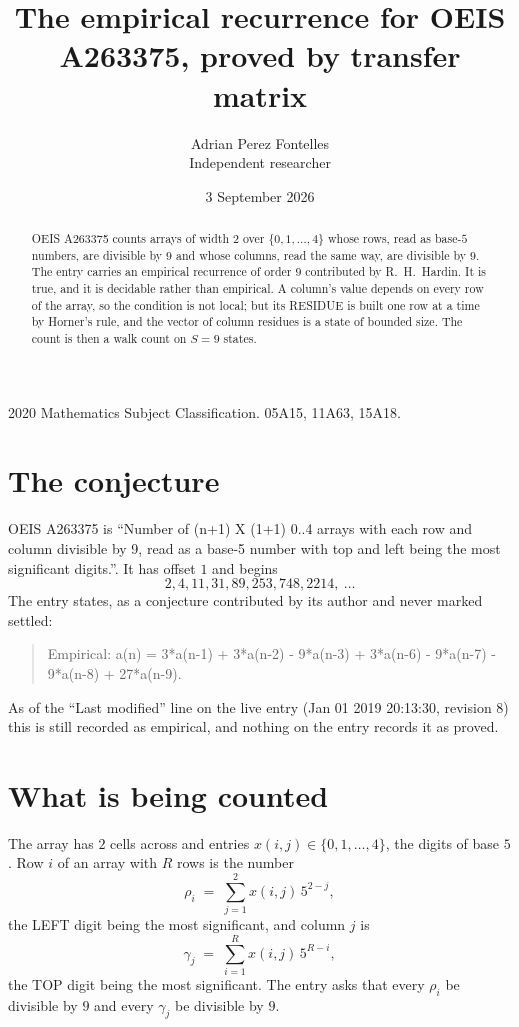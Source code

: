 \documentclass[11pt,a4paper]{article}
\title{The empirical recurrence for OEIS A263375, proved by transfer matrix}
\author{Adrian Perez Fontelles\\ \small Independent researcher}
\date{3 September 2026}
\theoremstyle{plain}
\theoremstyle{definition}
\begin{document}
\maketitle

\begin{abstract}
OEIS A263375 counts arrays of width $2$ over $\{0,1,\dots,4\}$ whose rows, read as base-$5$
numbers, are divisible by $9$ and whose columns, read the same way, are divisible by
$9$. The entry carries an empirical recurrence of order $9$ contributed by
R.~H.~Hardin. It is true, and it is decidable rather than empirical. A column's value depends on
every row of the array, so the condition is not local; but its RESIDUE is built one row at a
time by Horner's rule, and the vector of column residues is a state of bounded size. The count
is then a walk count on $S=9$ states.
\end{abstract}

\noindent\small 2020 Mathematics Subject Classification. 05A15, 11A63, 15A18.\normalsize

\section{The conjecture}

OEIS A263375 is ``Number of (n+1) X (1+1) 0..4 arrays with each row and column divisible by 9, read as a base-5 number with top and left being the most significant digits.''. It has offset $1$ and begins
\[
2, 4, 11, 31, 89, 253, 748, 2214,\ \dots
\]
The entry states, as a conjecture contributed by its author and never marked settled:
\begin{quote}
Empirical: a(n) = 3*a(n-1) + 3*a(n-2) - 9*a(n-3) + 3*a(n-6) - 9*a(n-7) - 9*a(n-8) + 27*a(n-9).
\end{quote}
As of the ``Last modified'' line on the live entry (Jan 01 2019 20:13:30, revision 8) this is still
recorded as empirical, and nothing on the entry records it as proved.

\section{What is being counted}

The array has $2$ cells across and entries $x(i,j)\in\{0,1,\dots,4\}$, the digits of
base $5$. Row $i$ of an array with $R$ rows is the number
\[
\rho_i\;=\;\sum_{j=1}^{2}x(i,j)\,5^{2-j} ,
\]
the LEFT digit being the most significant, and column $j$ is
\[
\gamma_j\;=\;\sum_{i=1}^{R}x(i,j)\,5^{R-i} ,
\]
the TOP digit being the most significant. The entry asks that every $\rho_i$ be divisible by
$9$ and every $\gamma_j$ be divisible by $9$.
\end{document}
